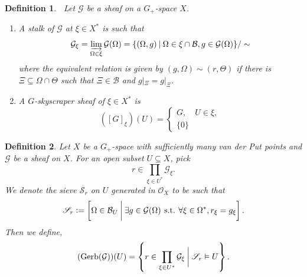 \documentclass[8pt]{article}
\numberwithin{equation}{section}
\newtheorem{definition}{Definition}[subsection]
\DeclareMathOperator{\straw}{s.t.}
\newcommand{\defeq}{\vcentcolon=}
\newcommand{\Ouv}{\mathscr{O}}
\newcommand{\sep}[0]{\:|\:}
\newcommand{\st}[0]{\:\straw\:}
\newcommand{\sS}[0]{\mathscr{S}}
\newcommand{\cB}[0]{\mathcal{B}}
\begin{document}
\begin{definition}$\:$
    \label{definition_10_2}
    Let $\mathcal{G}$ be a sheaf on a $G_+$-space $X$.
    \begin{enumerate}
        \item A stalk of $\mathcal{G}$ at $\xi\in X^*$ is such that
        \begin{equation*}
            \mathcal{G}_\xi = \varinjlim_{\Omega\in\xi}\mathcal{G}(\Omega) = \{(\Omega,g)\sep \Omega\in\xi\cap\cB,g\in\mathcal{G}(\Omega)\}/\sim
        \end{equation*}
        where the equivalent relation is given by $(g,\Omega)\sim (r,\Theta)$ if there is $\Xi\subseteq\Omega\cap \Theta$ such that $\Xi\in\cB$ and $g|_{\Xi} = g|_{\Xi}$.
        \item A $G$-skyscraper sheaf of $\xi\in X^*$ is \begin{equation*}
            ([G]_\xi)(U) = \begin{cases}
                G,\quad U\in\xi,\\
                \{0\}
            \end{cases}
        \end{equation*}
    \end{enumerate}
\end{definition}

\begin{definition}
    Let $X$ be a $G_+$-space with sufficiently many van der Put points and $\mathcal{G}$ be a sheaf on $X$. For an open subset $U\subseteq X$, pick
    \begin{equation*}
        r\in \prod_{\xi\in U^*}\mathcal{G}_\xi.
    \end{equation*}
    We denote the sieve $\mathscr{S}_r$ on $U$ generated in $\Ouv_X$ to be such that 
    \begin{equation*}
        \mathscr{S}_r \defeq \left[\Omega\in\cB_U\:\bigg{\vert}\:\exists g\in\mathcal{G}(\Omega) \st\forall \xi\in \Omega^*, r_\xi = g_\xi\right].
    \end{equation*}
    Then we define,
    \begin{equation*}
        (\mathrm{Gerb}(\mathcal{G}))(U) = \left\{r\in\prod_{\xi\in U^*}\mathcal{G}_\xi\:\bigg{\vert}\:\sS_r\vDash U\right\}.
    \end{equation*}
\end{definition}
\end{document}
